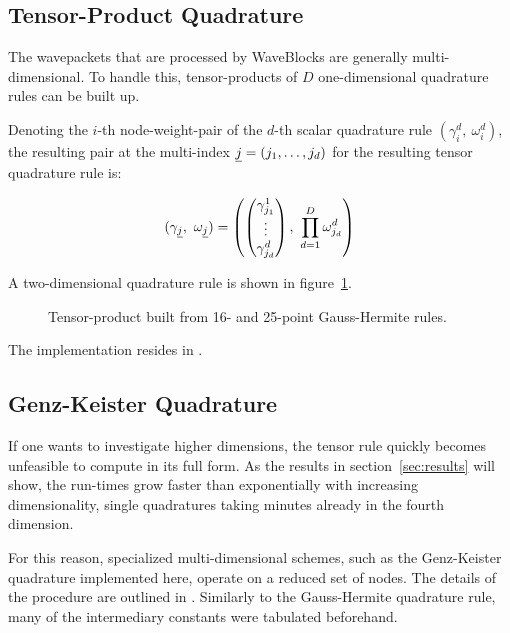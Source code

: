 \subsection{Tensor-Product Quadrature}
\label{subsec:tpquad}

The wavepackets that are processed by WaveBlocks are generally multi-dimensional.
To handle this, tensor-products of $D$ one-dimensional quadrature rules can be
built up.

Denoting the $i$-th node-weight-pair of the $d$-th scalar quadrature rule
$(\gamma_i^d,\ \omega_i^d)$, the resulting pair at the multi-index $\underline{j} =
(j_1, \ldots, j_d)$ for the resulting tensor quadrature rule is:

\begin{equation}
  (\gamma_{\underline{j}},\ \omega_{\underline{j}}) = \left(
    \begin{pmatrix} \gamma_{j_1}^1 \\ \vdots \\ \gamma_{j_d}^d \end{pmatrix},
    \ \prod_{d=1}^D \omega_{j_d}^d
  \right)
\end{equation}

A two-dimensional quadrature rule is shown in figure~\ref{fig:tpexample}.

\begin{figure}
  \center
  
  \caption{Tensor-product built from 16- and 25-point Gauss-Hermite rules.}
  \label{fig:tpexample}
\end{figure}

The implementation resides in .


\subsection{Genz-Keister Quadrature}
\label{subsec:gkquad}

If one wants to investigate higher dimensions, the tensor rule quickly becomes
unfeasible to compute in its full form.
As the results in section~\ref{sec:results} will show, the run-times grow
faster than exponentially with increasing dimensionality, single quadratures
taking minutes already in the fourth dimension.

For this reason, specialized multi-dimensional schemes, such as the Genz-Keister
quadrature implemented here, operate on a reduced set of nodes.
The details of the procedure are outlined in \cite{B15_601}.
Similarly to the Gauss-Hermite quadrature rule, many of the intermediary
constants were tabulated beforehand.

